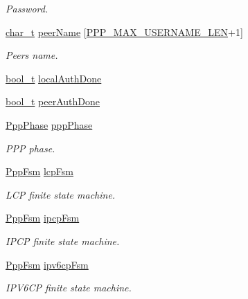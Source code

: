 \begin{DoxyCompactItemize}
\begin{DoxyCompactList}\small\item\em Password. \end{DoxyCompactList}\item 
\hyperlink{compiler__port_8h_a40bb5262bf908c328fbcfbe5d29d0201}{char\+\_\+t} \hyperlink{struct__PppContext_a103c7ad1970a95197be621b1ad411588}{peer\+Name} \mbox{[}\hyperlink{ppp_8h_acafaf0139acdee8a293aa63cd32666b6}{P\+P\+P\+\_\+\+M\+A\+X\+\_\+\+U\+S\+E\+R\+N\+A\+M\+E\+\_\+\+L\+EN}+1\mbox{]}
\begin{DoxyCompactList}\small\item\em Peer\textquotesingle{}s name. \end{DoxyCompactList}\item 
\hyperlink{compiler__port_8h_a812d16e5494522586b3784e55d479912}{bool\+\_\+t} \hyperlink{struct__PppContext_a2f4dc2589744adf2ba4e93cf312a8ef7}{local\+Auth\+Done}
\item 
\hyperlink{compiler__port_8h_a812d16e5494522586b3784e55d479912}{bool\+\_\+t} \hyperlink{struct__PppContext_a2f0a71c62240641fe3744ff7d31759cd}{peer\+Auth\+Done}
\item 
\hyperlink{ppp_8h_aa187b5eb62890e0b7bac9a94259c1d29}{Ppp\+Phase} \hyperlink{struct__PppContext_af9fee6f7b455627524fd0c12d2670c07}{ppp\+Phase}
\begin{DoxyCompactList}\small\item\em P\+PP phase. \end{DoxyCompactList}\item 
\hyperlink{structPppFsm}{Ppp\+Fsm} \hyperlink{struct__PppContext_a793e2610301d4d7344ed44e0b0385ed9}{lcp\+Fsm}
\begin{DoxyCompactList}\small\item\em L\+CP finite state machine. \end{DoxyCompactList}\item 
\hyperlink{structPppFsm}{Ppp\+Fsm} \hyperlink{struct__PppContext_a9fd2038d20858f726c6414a7cf95ed4a}{ipcp\+Fsm}
\begin{DoxyCompactList}\small\item\em I\+P\+CP finite state machine. \end{DoxyCompactList}\item 
\hyperlink{structPppFsm}{Ppp\+Fsm} \hyperlink{struct__PppContext_a483c004aca3fba3f6c04a341f90572f8}{ipv6cp\+Fsm}
\begin{DoxyCompactList}\small\item\em I\+P\+V6\+CP finite state machine. \end{DoxyCompactList}\item 

\end{DoxyCompactItemize}
